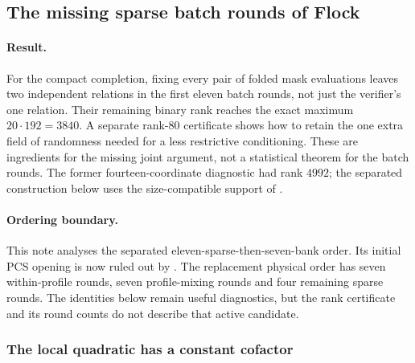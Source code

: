 \subsection{The missing sparse batch rounds of Flock}\label{note:zk-flock-middle}

\paragraph{Result.} For the compact completion, fixing every pair of folded mask evaluations leaves two independent relations in the first eleven batch rounds, not just the verifier's one relation. Their remaining binary rank reaches the exact maximum $20\cdot192=3840$. A separate rank-$80$ certificate shows how to retain the one extra field of randomness needed for a less restrictive conditioning. These are ingredients for the missing joint argument, not a statistical theorem for the batch rounds. The former fourteen-coordinate diagnostic had rank $4992$; the separated construction below uses the size-compatible support of .

\paragraph{Ordering boundary.} This note analyses the separated eleven-sparse-then-seven-bank order. Its initial PCS opening is now ruled out by . The replacement physical order has seven within-profile rounds, seven profile-mixing rounds and four remaining sparse rounds. The identities below remain useful diagnostics, but the rank certificate and its round counts do not describe that active candidate.

\subsubsection{The local quadratic has a constant cofactor}


